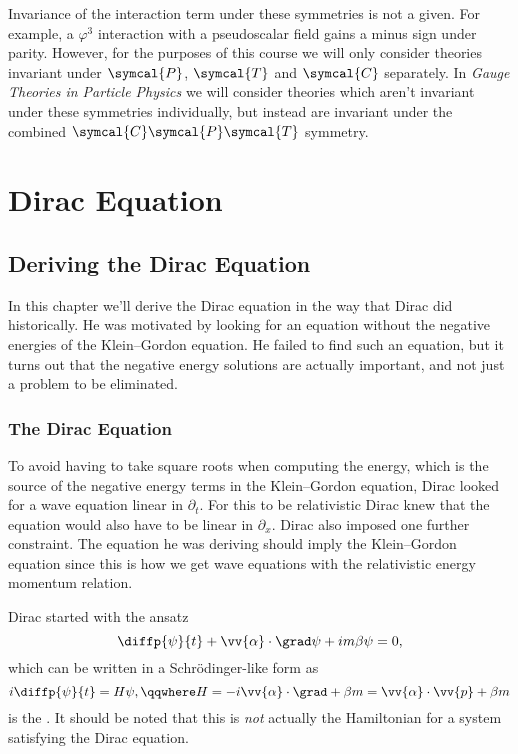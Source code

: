 \documentclass[fleqn]{NotesClass}
\newcommand*{\course}[1]{\textit{#1}}
\newcommand{\parity}{\symcal{P}}
\newcommand{\chargeConjugation}{\symcal{C}}
\newcommand{\timeReversal}{\symcal{T}}
\begin{document}
    Invariance of the interaction term under these symmetries is not a given.
    For example, a \(\varphi^3\) interaction with a pseudoscalar field gains a minus sign under parity.
    However, for the purposes of this course we will only consider theories invariant under \(\parity\), \(\timeReversal\) and \(\chargeConjugation\) separately.
    In \course{Gauge Theories in Particle Physics} we will consider theories which aren't invariant under these symmetries individually, but instead are invariant under the combined \(\chargeConjugation \parity \timeReversal\)
    symmetry.
    
    \part{Dirac Equation}
    \chapter{Deriving the Dirac Equation}
    In this chapter we'll derive the Dirac equation in the way that Dirac did historically.
    He was motivated by looking for an equation without the negative energies of the Klein--Gordon equation.
    He failed to find such an equation, but it turns out that the negative energy solutions are actually important, and not just a problem to be eliminated.
    
    \section{The Dirac Equation}
    To avoid having to take square roots when computing the energy, which is the source of the negative energy terms in the Klein--Gordon equation, Dirac looked for a wave equation linear in \(\partial_t\).
    For this to be relativistic Dirac knew that the equation would also have to be linear in \(\partial_x\).
    Dirac also imposed one further constraint.
    The equation he was deriving should imply the Klein--Gordon equation since this is how we get wave equations with the relativistic energy momentum relation.
    
    Dirac started with the ansatz
    \begin{equation}
        \diffp{\psi}{t} + \vv{\alpha} \cdot \grad\psi + im\beta \psi = 0,
    \end{equation}
    which can be written in a Schrödinger-like form as
    \begin{equation}
        i\diffp{\psi}{t} = H\psi, \qqwhere H = -i\vv{\alpha} \cdot \grad + \beta m = \vv{\alpha} \cdot \vv{p} + \beta m
    \end{equation}
    is the .
    It should be noted that this is \emph{not} actually the Hamiltonian for a system satisfying the Dirac equation.
    
\end{document}

